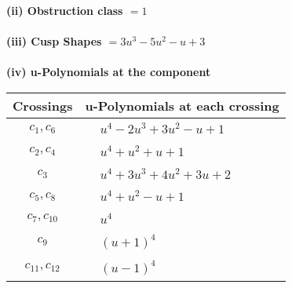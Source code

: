 \documentclass[1p]{elsarticle_modified}
\theoremstyle{definition}
\begin{document}
\flushleft \textbf{(ii) Obstruction class $= 1$}\\~\\
\flushleft \textbf{(iii) Cusp Shapes $= 3 u^3-5 u^2- u+3$}\\~\\
\newpage\renewcommand{\arraystretch}{1}
\flushleft \textbf{(iv) u-Polynomials at the component}\newline \\
\begin{tabular}{m{50pt}|m{274pt}}
Crossings & \hspace{64pt}u-Polynomials at each crossing \\
\hline $$\begin{aligned}c_{1},c_{6}\end{aligned}$$&$\begin{aligned}
&u^4-2 u^3+3 u^2- u+1
\end{aligned}$\\
\hline $$\begin{aligned}c_{2},c_{4}\end{aligned}$$&$\begin{aligned}
&u^4+u^2+u+1
\end{aligned}$\\
\hline $$\begin{aligned}c_{3}\end{aligned}$$&$\begin{aligned}
&u^4+3 u^3+4 u^2+3 u+2
\end{aligned}$\\
\hline $$\begin{aligned}c_{5},c_{8}\end{aligned}$$&$\begin{aligned}
&u^4+u^2- u+1
\end{aligned}$\\
\hline $$\begin{aligned}c_{7},c_{10}\end{aligned}$$&$\begin{aligned}
&u^4
\end{aligned}$\\
\hline $$\begin{aligned}c_{9}\end{aligned}$$&$\begin{aligned}
&(u+1)^4
\end{aligned}$\\
\hline $$\begin{aligned}c_{11},c_{12}\end{aligned}$$&$\begin{aligned}
&(u-1)^4
\end{aligned}$\\
\hline
\end{tabular}\\~\\
\end{document}
